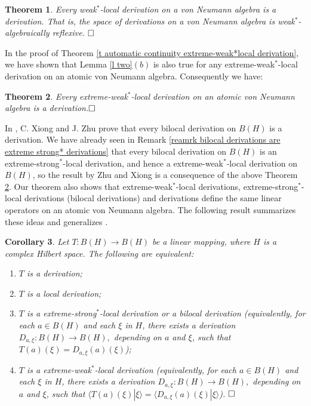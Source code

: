 \documentclass[11pt]{amsart}
\newtheorem{theorem}{Theorem}[section]
\newtheorem{corollary}[theorem]{Corollary}
\begin{document}
\begin{theorem}\label{t weak*-local derivations are derivations} Every weak$^*$-local derivation on a von Neumann algebra is a derivation. That is, the space of derivations on a von Neumann algebra is weak$^*$-algebraically reflexive. $\hfill\Box$
\end{theorem}

In the proof of Theorem \ref{t automatic continuity extreme-weak*local derivation}, we have shown that Lemma \ref{l two}$(b)$ is also true for any extreme-weak$^*$-local derivation on an atomic von Neumann algebra. Consequently we have:

\begin{theorem}\label{t extreme-weak*-local derivations are derivations} Every extreme-weak$^*$-local derivation on an atomic von Neumann algebra is a derivation.$\hfill\Box$
\end{theorem}

In \cite[Theorem 3]{ZhuXiong97}, C. Xiong and J. Zhu prove that every bilocal derivation on $B(H)$ is a derivation. We have already seen in Remark \ref{reamrk bilocal derivations are extreme strong* derivations} that every bilocal derivation on $B(H)$ is an extreme-strong$^*$-local derivation, and hence a extreme-weak$^*$-local derivation on $B(H)$, so the result by Zhu and Xiong is a consequence of the above Theorem \ref{t extreme-weak*-local derivations are derivations}. Our theorem also shows that extreme-weak$^*$-local derivations, extreme-strong$^*$-local derivations (bilocal derivations) and derivations define the same linear operators on an atomic von Neumann algebra. The following result summarizes these ideas and generalizes \cite[Theorem 3]{ZhuXiong97}. \smallskip

\begin{corollary}\label{cor Xiong Zhu improved} Let $T: B(H) \to B(H)$ be a linear mapping, where $H$ is a complex Hilbert space. The following are equivalent:\begin{enumerate}[$(a)$] \item $T$ is a derivation;
\item $T$ is a local derivation;
\item $T$ is a extreme-strong$^*$-local derivation or a bilocal derivation {\rm(}equivalently, for each $a\in B(H)$ and each $\xi$  in $H$, there exists a derivation $D_{a,\xi}: B(H) \to B(H),$ depending on $a$ and $\xi$, such that $T(a) (\xi) = D_{a,\xi}(a) (\xi)${\rm)};
\item $T$ is a extreme-weak$^*$-local derivation {\rm(}equivalently, for each $a\in B(H)$ and each $\xi$  in $H$, there exists a derivation $D_{a,\xi}: B(H) \to B(H),$ depending on $a$ and $\xi$, such that $\langle T(a) (\xi) | \xi \rangle = \langle D_{a,\xi}(a) (\xi) | \xi\rangle${\rm)}. $\hfill\Box$
\end{enumerate}
\end{corollary}
\end{document}

